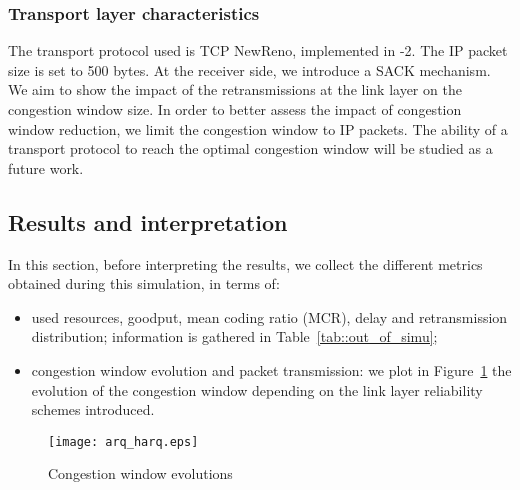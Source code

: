 \documentclass[conference,letterpaper]{IEEEtran}
\begin{document}
\subsubsection{Transport layer characteristics}
The transport protocol used is TCP NewReno, implemented in -2. The IP packet size is set to 500 bytes. At the receiver side, we introduce a SACK mechanism. We aim to show the impact of the retransmissions at the link layer on the congestion window size. In order to better assess the impact of congestion window reduction, we limit the congestion window to  IP packets. The ability of a transport protocol to reach the optimal congestion window will be studied as a future work.

\subsection{Results and interpretation}
\label{subsec::illustration_interpretation}
In this section, before interpreting the results, we collect the different metrics obtained during this simulation, in terms of: 
\begin{itemize}
\item used resources, goodput, mean coding ratio (MCR), delay and retransmission distribution; information is gathered in Table~\ref{tab::out_of_simu};
\item congestion window evolution and packet transmission: we plot in Figure~\ref{fig::cwnd_arq_harq} the evolution of the congestion window depending on the link layer reliability schemes introduced.
\end{itemize}

\begin{figure}[h]
    \begin{center}
	\texttt{[image: arq\_harq.eps]}
	\caption{Congestion window evolutions}
	\label{fig::cwnd_arq_harq}
    \end{center}
\end{figure}
\end{document}
